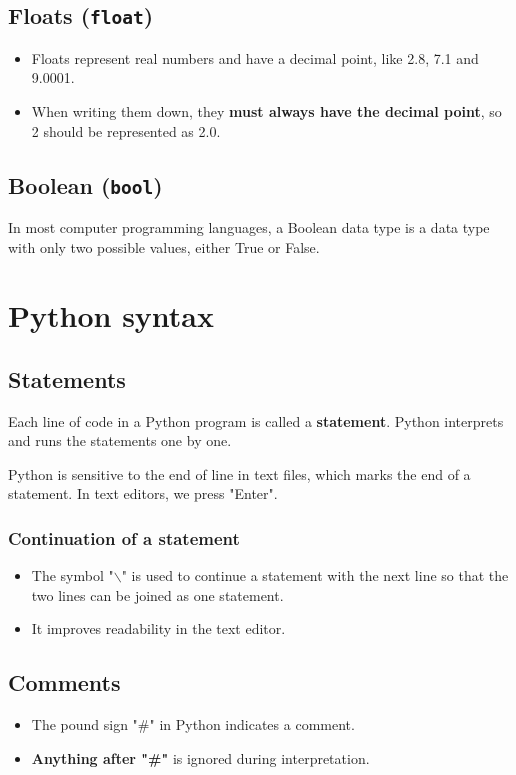 \documentclass[11pt]{article}
\begin{document}
\subsection{Floats (\texttt{float})}
\label{sec:org57643fd}
\begin{itemize}
\item Floats represent real numbers and have a decimal point, like 2.8, 7.1 and 9.0001.
\item When writing them down, they \textbf{must always have the decimal point}, so 2 should be represented as 2.0.
\end{itemize}
\subsection{Boolean (\texttt{bool})}
\label{sec:orgbe95078}
In most computer programming languages, a Boolean data type is a data type with only two possible values, either True or False.

 \newpage
\section{Python syntax}
\label{sec:orgff4d72c}

\subsection{Statements}
\label{sec:org1c3335d}
Each line of code in a Python program is called a \textbf{statement}. Python interprets and runs the statements one by one.

Python is sensitive to the end of line in text files, which marks the end of a statement. In text editors, we press "Enter".
\subsubsection{Continuation of a statement}
\label{sec:org69a2449}
\begin{itemize}
\item The symbol "$\backslash$" is used to continue a statement with the next line so that the two lines can be joined as one statement.
\item It improves readability in the text editor.
\end{itemize}
\subsection{Comments}
\label{sec:org8647887}
\begin{itemize}
\item The pound sign "\#" in Python indicates a comment.
\item \textbf{Anything after "\#"} is ignored during interpretation.
\end{itemize}
\end{document}
